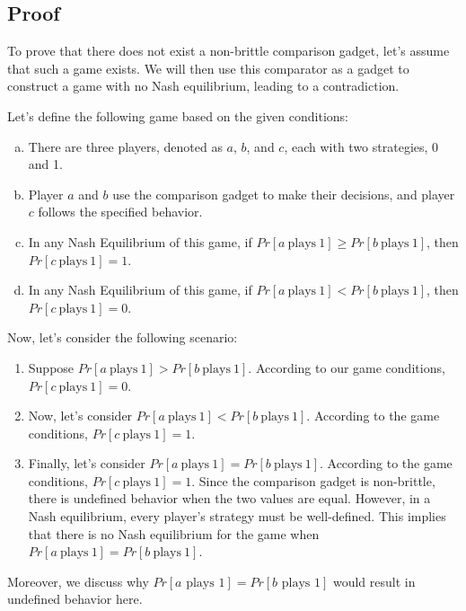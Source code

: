 \documentclass{article}
\begin{document}
\subsection{Proof}

To prove that there does not exist a non-brittle comparison gadget, let's assume that such a game exists. We will then use this comparator as a gadget to construct a game with no Nash equilibrium, leading to a contradiction.

Let's define the following game based on the given conditions:

\begin{enumerate}[(a)]
    \item There are three players, denoted as \(a\), \(b\), and \(c\), each with two strategies, 0 and 1.
    \item Player \(a\) and \(b\) use the comparison gadget to make their decisions, and player \(c\) follows the specified behavior.
    \item In any Nash Equilibrium of this game, if \(Pr[a~\text{plays}~1] \ge Pr[b~\text{plays}~1]\), then \(Pr[c~\text{plays}~1] = 1\).
    \item In any Nash Equilibrium of this game, if \(Pr[a~\text{plays}~1] < Pr[b~\text{plays}~1]\), then \(Pr[c~\text{plays}~1] = 0\).
\end{enumerate}

Now, let's consider the following scenario:

\begin{enumerate}[1.]
    \item Suppose \(Pr[a~\text{plays}~1] > Pr[b~\text{plays}~1]\). According to our game conditions, \(Pr[c~\text{plays}~1] = 0\).
    \item Now, let's consider \(Pr[a~\text{plays}~1] < Pr[b~\text{plays}~1]\). According to the game conditions, \(Pr[c~\text{plays}~1] = 1\).
    \item Finally, let's consider \(Pr[a~\text{plays}~1] = Pr[b~\text{plays}~1]\). 
    According to the game conditions, \(Pr[c~\text{plays}~1] = 1\).
    Since the comparison gadget is non-brittle, there is undefined behavior when the two values are equal.
    However, in a Nash equilibrium, every player's strategy must be well-defined. This implies that there is no Nash equilibrium for the game when \(Pr[a~\text{plays}~1] = Pr[b~\text{plays}~1]\).
\end{enumerate}

Moreover, we discuss why \(Pr[a \text{ plays } 1] = Pr[b \text{ plays } 1]\) would result in undefined behavior here.
\end{document}
